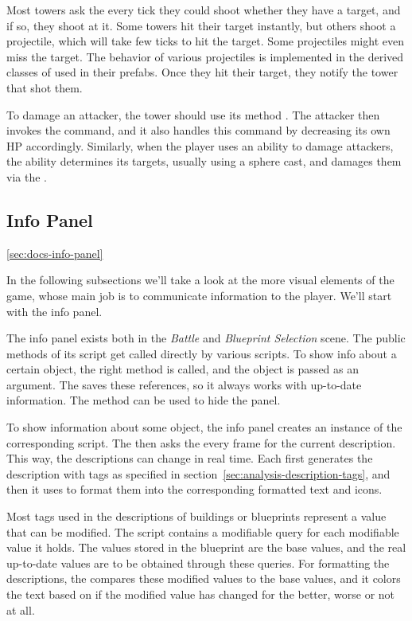 Most towers ask the  every tick they could shoot whether they have a target, and if so, they shoot at it.
Some towers hit their target instantly, but others shoot a projectile, which will take few ticks to hit the target.
Some projectiles might even miss the target.
The behavior of various projectiles is implemented in the derived classes of  used in their prefabs.
Once they hit their target, they notify the tower that shot them.

To damage an attacker, the tower should use its method .
The attacker then invokes the  command, and it also handles this command by decreasing its own HP accordingly.
Similarly, when the player uses an ability to damage attackers, the ability determines its targets, usually using a sphere cast, and damages them via the .


\subsection{Info Panel}\ref{sec:docs-info-panel}

In the following subsections we'll take a look at the more visual elements of the game, whose main job is to communicate information to the player.
We'll start with the info panel.

The info panel exists both in the \emph{Battle} and \emph{Blueprint Selection} scene.
The public methods of its  script get called directly by various scripts.
To show info about a certain object, the right method is called, and the object is passed as an argument.
The  saves these references, so it always works with up-to-date information.
The  method can be used to hide the panel.

To show information about some object, the info panel creates an instance of the corresponding  script.
The  then asks the  every frame for the current description.
This way, the descriptions can change in real time.
Each  first generates the description with tags as specified in section~\ref{sec:analysis-description-tags}, and then it uses  to format them into the corresponding formatted text and icons.

Most tags used in the descriptions of buildings or blueprints represent a value that can be modified.
The  script contains a modifiable query for each modifiable value it holds.
The values stored in the blueprint are the base values, and the real up-to-date values are to be obtained through these queries.
For formatting the descriptions, the  compares these modified values to the base values, and it colors the text based on if the modified value has changed for the better, worse or not at all.

